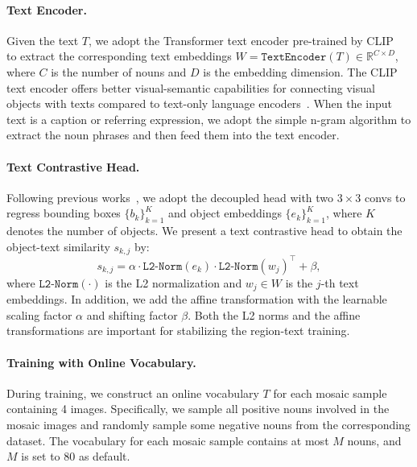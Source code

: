 \documentclass[10pt,twocolumn,letterpaper]{article}
\newcommand{\name}{YOLO-World}
\begin{document}
\paragraph{Text Encoder.}
Given the text $T$, we adopt the Transformer text encoder pre-trained by CLIP~\cite{CLIP} to extract the corresponding text embeddings $W\!=\!\texttt{TextEncoder}(T) \!\in\! \mathbb{R}^{C\!\times\!D}$, where $C$ is the number of nouns and $D$ is the embedding dimension.
The CLIP text encoder offers better visual-semantic capabilities for connecting visual objects with texts compared to text-only language encoders~\cite{BERT}.
When the input text is a caption or referring expression, we adopt the simple n-gram algorithm to extract the noun phrases and then feed them into the text encoder.

\paragraph{Text Contrastive Head.}
Following previous works~\cite{yolov8_ultralytics}, we adopt the decoupled head with two $3\times3$ convs to regress bounding boxes $\{b_k\}^K_{k=1}$ and object embeddings $\{e_k\}^K_{k=1}$, where $K$ denotes the number of objects.
We present a text contrastive head to obtain the object-text similarity $s_{k,j}$ by:
\begin{equation}
    s_{k,j} = \alpha\cdot \texttt{L2-Norm}(e_k) \cdot \texttt{L2-Norm}(w_j)^{\top} + \beta,
\end{equation}
where $\texttt{L2-Norm}(\cdot)$ is the L2 normalization and $w_j \in W$ is the $j$-th text embeddings. In addition, we add the affine transformation with the learnable scaling factor $\alpha$ and shifting factor $\beta$.
Both the L2 norms and the affine transformations are important for stabilizing the region-text training.

\paragraph{Training with Online Vocabulary.}
During training, we construct an online vocabulary $T$ for each mosaic sample containing 4 images.
Specifically, we sample all positive nouns involved in the mosaic images and randomly sample some negative nouns from the corresponding dataset.
The vocabulary for each mosaic sample contains at most $M$ nouns, and $M$ is set to 80 as default.
\end{document}
